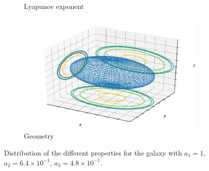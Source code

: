 \begin{figure}[h]
\begin{subfigure}[t]{0.4\textwidth}
        \caption{Lyapunov exponent}
    \end{subfigure}
    \begin{subfigure}[t]{0.4\textwidth}
        \includegraphics[width=\textwidth]{"../Files/Week 13/images/5_ellipsoid"}
        \caption{Geometry}
    \end{subfigure}
    \caption{Distribution of the different properties for the galaxy with $a_1 = 1$, $a_2 = 6.4\times10^{-1}$, $a_3 = 4.8\times10^{-1}$.}
\end{figure}


